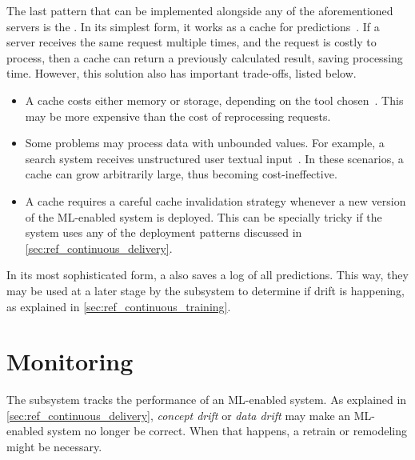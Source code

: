   The last pattern that can be implemented alongside any of the aforementioned
  servers is the . In its simplest form,
  it works as a cache for predictions~\parencite{Lakshmanan2020MachineMLOps,
  Sadalage2012NoSQLPersistence}. If a server receives the same request multiple
  times, and the request is costly to process, then a cache can return a
  previously calculated result, saving processing time. However, this
  solution also has important trade-offs, listed below.
  \begin{itemize}
    \item A cache costs either memory or storage, depending on the tool
          chosen~\parencite{Sadalage2012NoSQLPersistence}. This may
          be more expensive than the cost of reprocessing requests.
    \item Some problems may process data with unbounded values.
          For example, a search system receives unstructured user textual
          input~\parencite{Manning2008IntroductionRetrieval, 
          RussellS2021Artificial4th}.
          In these scenarios, a cache can grow arbitrarily large,
          thus becoming cost-ineffective.
    \item A cache requires a careful cache invalidation strategy whenever
          a new version of the ML-enabled system is deployed. This can be
          specially tricky if the system uses any of the deployment 
          patterns discussed in \cref{sec:ref_continuous_delivery}.
  \end{itemize}

  In its most sophisticated form, a 
  also saves a log of all predictions. This way, they may be used at a later
  stage by the   subsystem to determine if drift
  is happening, as explained in \cref{sec:ref_continuous_training}.

  \section{Monitoring}
  \label{sec:ref_monitoring}

  The  subsystem tracks the performance of an
  ML-enabled system. As explained in \cref{sec:ref_continuous_delivery},
  \emph{concept drift} or \emph{data drift} may make an ML-enabled system
  no longer be correct. When that happens, a retrain or remodeling might
  be necessary.

